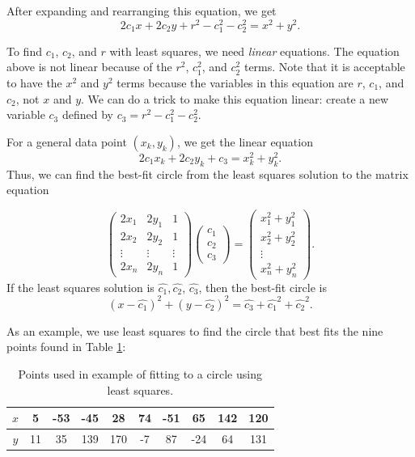 After expanding and rearranging this equation, we get
\begin{equation*}
\label{circle2}
2c_1x + 2c_2y + r^2 - c_1^2 - c_2^2 = x^2 + y^2.
\end{equation*}

To find $c_1$, $c_2$, and $r$ with least squares, we need \emph{linear} equations. 
The equation above is not linear because of the $r^2$, $c_1^2$, and $c_2^2$ terms. Note that it is acceptable to have the $x^2$ and $y^2$ terms because the variables in this equation are $r$, $c_1$, and $c_2$, not $x$ and $y$.
We can do a trick to make this equation linear: create a new variable $c_3$ defined by $c_3 = r^2-c_1^2-c_2^2$.

For a general data point $(x_k, y_k)$, we get the linear equation
\begin{equation*}
2c_1x_k+2c_2y_k+c_3=x_k^2+y_k^2.
\end{equation*}
Thus, we can find the best-fit circle from the least squares solution to the matrix equation

\begin{equation}\label{equ:circle_fit}
\begin{pmatrix}
2 x_1 & 2 y_1 & 1\\
2 x_2 & 2 y_2 & 1\\
\vdots & \vdots & \vdots \\
2 x_n & 2 y_n & 1
\end{pmatrix}
\begin{pmatrix}
c_1\\
c_2\\
c_3
\end{pmatrix}=
\begin{pmatrix}
x_1^2 + y_1^2\\
x_2^2 + y_2^2\\
\vdots\\
x_n^2 + y_n^2
\end{pmatrix}.
\end{equation}
If the least squares solution is $\widehat{c_1}, \widehat{c_2}$, $\widehat{c_3}$, then the best-fit circle is
\[
(x-\widehat{c_1})^2 + (y-\widehat{c_2})^2 = \widehat{c_3}+\widehat{c_1}^2+\widehat{c_2}^2.
\]

As an example, we use least squares to find the circle that best fits the nine points found in Table \ref{table:circlepts}:
\begin{table}
\begin{tabular}{c||c|c|c|c|c|c|c|c|c}
$x$& 5  &-53 & -45 &  28 & 74 & -51 &  65 & 142 & 120 \\ \hline
$y$& 11 & 35 & 139 & 170 & -7 &  87 & -24 &  64 & 131 \\
\end{tabular}
\caption{Points used in example of fitting to a circle using least squares.}
\label{table:circlepts}
\end{table}

